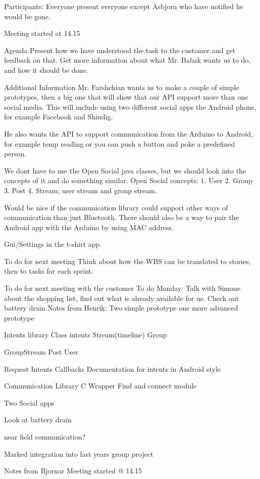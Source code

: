 Participants: Everyone present everyone except Asbjorn who have notified he would be gone.


Meeting started at 14.15

Agenda
Present how we have understood the task to the customer and get feedback on that.
Get more information about what Mr. Babak wants us to do, and how it should be done.

Additional Information
Mr. Farshchian wants us to make a couple of simple prototypes, then a big one that will show that our API support more than one social media. This will include using two different social apps the Android phone, for example Facebook and Shindig.


He also wants the API to support communication from the Arduino to Android, for example temp reading or you can push a button and poke a predefined person.

We dont have to use the Open Social java classes, but we should look into the concepts of it and do something similar.
Open Social concepts:
1.  User
2.  Group
3.  Post
4.  Stream; user stream and group stream.

Would be nice if the communication library could support other ways of communication than just Bluetooth. There should also be a way to pair the Android app with the Arduino by using MAC address.


Gui/Settings in the t-shirt app.


To do for next meeting
Think about how the WBS can be translated to stories, then to tasks for each sprint.

To do for next meeting with the customer
To do Monday:
Talk with Simone about the shopping list, find out what is already available for us.
Check out battery drain
Notes from Henrik:
Two simple prototype
one more advanced prototype


Intents library
Class intents
Stream(timeline)
Group
                
GroupStream
Post
User                

Request Intents
Callbacks
Documentation for intents in Android style

Communication Library
C Wrapper
Find and connect module

Two Social apps


Look at battery drain

near field communication?

Marked integration into last years group project

Notes from Bjornar
Meeting started @ 14.15

